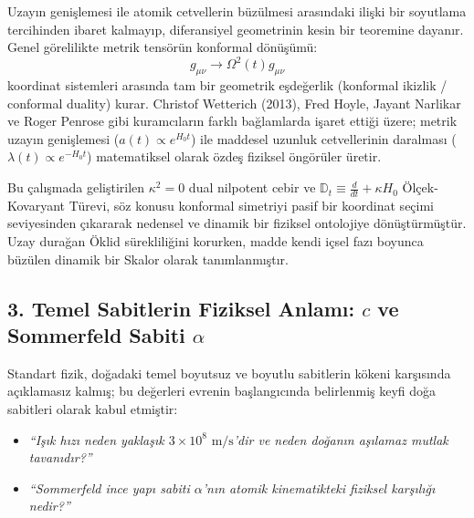 Uzayın genişlemesi ile atomik cetvellerin büzülmesi arasındaki ilişki bir soyutlama tercihinden ibaret kalmayıp, diferansiyel geometrinin kesin bir teoremine dayanır. Genel görelilikte metrik tensörün konformal dönüşümü:
\begin{equation}
    g_{\mu\nu} \to \Omega^2(t) g_{\mu\nu}
\end{equation}
koordinat sistemleri arasında tam bir geometrik eşdeğerlik (konformal ikizlik / conformal duality) kurar. Christof Wetterich (2013), Fred Hoyle, Jayant Narlikar ve Roger Penrose gibi kuramcıların farklı bağlamlarda işaret ettiği üzere; metrik uzayın genişlemesi ($a(t) \propto e^{H_0 t}$) ile maddesel uzunluk cetvellerinin daralması ($\lambda(t) \propto e^{-H_0 t}$) matematiksel olarak özdeş fiziksel öngörüler üretir.

Bu çalışmada geliştirilen $\kappa^2 = 0$ dual nilpotent cebir ve $\mathbb{D}_t \equiv \frac{d}{dt} + \kappa H_0$ Ölçek-Kovaryant Türevi, söz konusu konformal simetriyi pasif bir koordinat seçimi seviyesinden çıkararak nedensel ve dinamik bir fiziksel ontolojiye dönüştürmüştür. Uzay durağan Öklid sürekliliğini korurken, madde kendi içsel fazı boyunca büzülen dinamik bir Skalor olarak tanımlanmıştır.

\subsection*{3. Temel Sabitlerin Fiziksel Anlamı: $c$ ve Sommerfeld Sabiti $\alpha$}

Standart fizik, doğadaki temel boyutsuz ve boyutlu sabitlerin kökeni karşısında açıklamasız kalmış; bu değerleri evrenin başlangıcında belirlenmiş keyfi doğa sabitleri olarak kabul etmiştir:
\begin{itemize}
    \item \textit{``Işık hızı neden yaklaşık $3 \times 10^8\text{ m/s}$'dir ve neden doğanın aşılamaz mutlak tavanıdır?''}
    \item \textit{``Sommerfeld ince yapı sabiti $\alpha$'nın atomik kinematikteki fiziksel karşılığı nedir?''}
\end{itemize}

